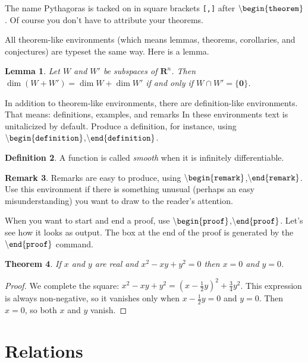 \documentclass[12pt,letterpaper]{amsart}
\newcommand{\RR}{\mathbf R}  %
\newcommand{\sm}{\setminus}
\newcommand{\bgn}[1]{$\tt {\sm}begin\{#1\}$}
\newcommand{\nd}[1]{$\tt {\sm}end\{#1\}$}
\theoremstyle{plain}
\newtheorem{theorem}{Theorem}[section]
\newtheorem{lemma}[theorem]{Lemma}
\theoremstyle{definition}
\newtheorem{definition}[theorem]{Definition}
\newtheorem{remark}[theorem]{Remark}
\numberwithin{equation}{section}
\begin{document}
The name Pythagoras is tacked on 
in square brackets {\tt [,]} after 
\bgn{theorem}. Of course you don't have to attribute your theorems.

All theorem-like environments (which means lemmas, theorems, corollaries, 
and conjectures) are typeset the same way.  Here is a lemma.

\begin{lemma}
Let $W$ and $W'$ be subspaces of $\RR^n$.  
Then $\dim(W + W') = \dim W + \dim W'$ if and only if 
$W \cap W' = \{{\mathbf 0}\}$.
\end{lemma}



In addition to theorem-like environments, 
there are definition-like environments. 
That means: definitions, examples, and remarks
In these environments text is unitalicized by default. 
Produce a definition, for instance, using  
\bgn{definition},\nd{definition}.

\begin{definition}
A function is called {\it smooth} when it is infinitely differentiable. 
\end{definition}

\begin{remark}
Remarks are easy to produce, using 
\bgn{remark},\nd{remark}.
Use this 
environment if there is something unusual (perhaps an easy misunderstanding) 
you want to draw to the reader's attention.
\end{remark}


When you want to start and end a proof, use 
\bgn{proof},\nd{proof}.
Let's see how it looks as output.
The box at the end of the proof is generated by the \nd{proof} command.


\begin{theorem}
If $x$ and $y$ are real and $x^2 - xy + y^2 = 0$ then $x = 0$ and 
$y = 0$.
\end{theorem}

\begin{proof}
We complete the square: $x^2 - xy + y^2 = (x - \frac{1}{2}y)^2 + 
\frac{3}{4}y^2$.  This expression is always non-negative, so it 
vanishes only when $x - \frac{1}{2}y = 0$ and $y = 0$.  Then 
$x = 0$, so both $x$ and $y$ vanish. 
\end{proof}




\section{Relations}\label{notsec}
\end{document}
